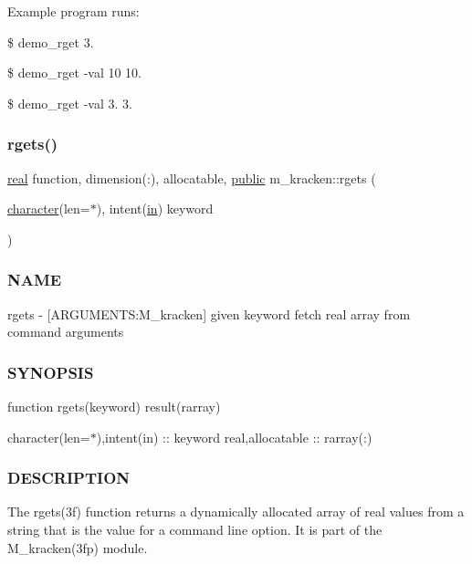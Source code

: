 Example program runs\+:

\$ demo\+\_\+rget 3.

\$ demo\+\_\+rget -\/val 10 10.

\$ demo\+\_\+rget -\/val 3. 3. \mbox{\label{namespacem__kracken_aa1a29fad1518c15d8710d273755a17cc}} 
\subsubsection{\texorpdfstring{rgets()}{rgets()}}
{\footnotesize\ttfamily \hyperlink{read__watch_83_8txt_abdb62bde002f38ef75f810d3a905a823}{real} function, dimension(\+:), allocatable, \hyperlink{M__stopwatch_83_8txt_a2f74811300c361e53b430611a7d1769f}{public} m\+\_\+kracken\+::rgets (\begin{DoxyParamCaption}\item[{\hyperlink{option__stopwatch_83_8txt_abd4b21fbbd175834027b5224bfe97e66}{character}(len=$\ast$), intent(\hyperlink{M__journal_83_8txt_afce72651d1eed785a2132bee863b2f38}{in})}]{keyword }\end{DoxyParamCaption})}



\subsubsection*{N\+A\+ME}

rgets -\/ \mbox{[}A\+R\+G\+U\+M\+E\+N\+TS\+:M\+\_\+kracken\mbox{]} given keyword fetch real array from command arguments \subsubsection*{S\+Y\+N\+O\+P\+S\+IS}

function rgets(keyword) result(rarray)

character(len=$\ast$),intent(in) \+:\+: keyword real,allocatable \+:\+: rarray(\+:) \subsubsection*{D\+E\+S\+C\+R\+I\+P\+T\+I\+ON}

The rgets(3f) function returns a dynamically allocated array of real values from a string that is the value for a command line option. It is part of the M\+\_\+kracken(3fp) module.

